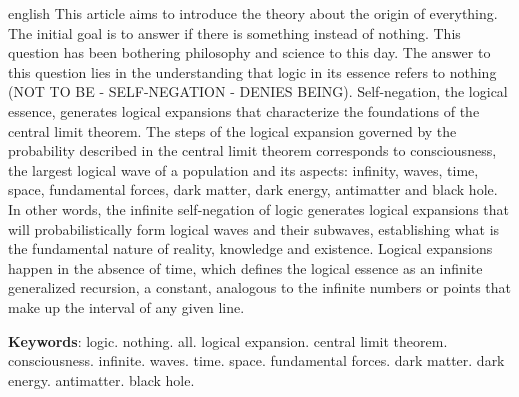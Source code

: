 \vspace{-5mm}
\renewcommand{\resumoname}{Abstract}
\begin{resumoumacoluna}
 \begin{otherlanguage*}{english}
	\vspace{-2mm}
	This article aims to introduce the theory about the origin of everything. The initial goal is to answer if there is something instead of nothing. This question has been bothering philosophy and science to this day. The answer to this question lies in the understanding that logic in its essence refers to nothing (NOT TO BE - SELF-NEGATION - DENIES BEING). Self-negation, the logical essence, generates logical expansions that characterize the foundations of the central limit theorem. The steps of the logical expansion governed by the probability described in the central limit theorem corresponds to consciousness, the largest logical wave of a population and its aspects: infinity, waves, time, space, fundamental forces, dark matter, dark energy, antimatter and black hole. In other words, the infinite self-negation of logic generates logical expansions that will probabilistically form logical waves and their subwaves, establishing what is the fundamental nature of reality, knowledge and existence. Logical expansions happen in the absence of time, which defines the logical essence as an infinite generalized recursion, a constant, analogous to the infinite numbers or points that make up the interval of any given line.
	
	\noindent
	\textbf{Keywords}: logic. nothing. all. logical expansion. central limit theorem. consciousness. infinite. waves. time. space. fundamental forces. dark matter. dark energy. antimatter. black hole.
 \end{otherlanguage*}  
\end{resumoumacoluna}
